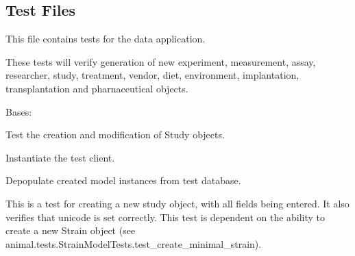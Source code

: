 \documentclass[letterpaper,10pt,english]{sphinxmanual}
\begin{document}
\subsection{Test Files}
\label{api:id2}\label{api:module-mousedb.data.tests}
This file contains tests for the data application.

These tests will verify generation of new experiment, measurement, assay, researcher, study, treatment, vendor, diet, environment, implantation, transplantation and pharnaceutical objects.

\begin{fulllineitems}
\label{api:mousedb.data.tests.StudyModelTests}
Bases: 

Test the creation and modification of Study objects.

\begin{fulllineitems}
\label{api:mousedb.data.tests.StudyModelTests.setUp}
Instantiate the test client.

\end{fulllineitems}


\begin{fulllineitems}
\label{api:mousedb.data.tests.StudyModelTests.tearDown}
Depopulate created model instances from test database.

\end{fulllineitems}


\begin{fulllineitems}
\label{api:mousedb.data.tests.StudyModelTests.test_create_studey_detailed}
This is a test for creating a new study object, with all fields being entered.  It also verifies that unicode is set correctly.  This test is dependent on the ability to create a new Strain object (see animal.tests.StrainModelTests.test\_create\_minimal\_strain).


\end{fulllineitems}
\end{fulllineitems}
\end{document}
